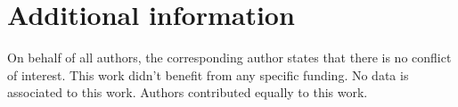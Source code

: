 \documentclass[sn-mathphys,Numbered]{sn-jnl}%
\theoremstyle{thmstyleone}%
\theoremstyle{thmstyletwo}%
\theoremstyle{thmstylethree}%
\begin{document}









\section*{Additional information}
On behalf of all authors, the corresponding author states that there is no conflict of interest. 
%
This work didn't benefit from any specific funding.
%
No data is associated to this work.
%
Authors contributed equally to this work.


	


%


 
\end{document}
